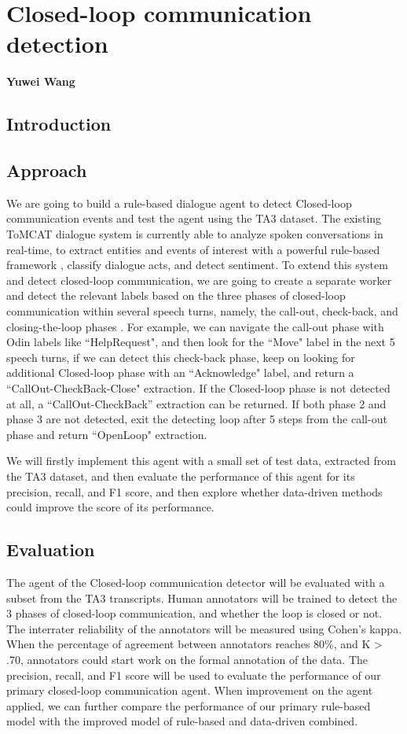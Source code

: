 \chapter{Closed-loop communication detection}
\label{ch:clc}
\textbf{Yuwei Wang}

\section{Introduction}

\section{Approach}

We are going to build a rule-based dialogue agent to detect Closed-loop communication events and test the agent using the TA3 dataset.
The existing ToMCAT dialogue system is currently able to analyze spoken
conversations in real-time, to extract entities and events of interest with a
powerful rule-based framework \citep{valenzuela-escarcega-etal-2016-odins}, classify
dialogue acts, and detect sentiment. To extend this system and detect
closed-loop communication, we are going to create a separate worker and detect
the relevant labels based on the three phases of closed-loop communication
within several speech turns, namely, the call-out, check-back, and
closing-the-loop phases \citep{Hargestam.ea:2013}. For example, we can
navigate the call-out phase with Odin labels like ``HelpRequest", and then look
for the ``Move" label in the next 5 speech turns, if we can detect this
check-back phase, keep on looking for additional Closed-loop phase with an
``Acknowledge" label, and return a ``CallOut-CheckBack-Close" extraction. If the
Closed-loop phase is not detected at all, a “CallOut-CheckBack” extraction can
be returned. If both phase 2 and phase 3 are not detected, exit the detecting
loop after 5 steps from the call-out phase and return ``OpenLoop" extraction.

We will firstly implement this agent with a small set of test data, extracted
from the TA3 dataset, and then evaluate the performance of this agent for its
precision, recall, and F1 score, and then explore whether data-driven methods
could improve the score of its performance.

\section{Evaluation}

The agent of the Closed-loop communication detector will be evaluated with a
subset from the TA3 transcripts. Human annotators will be trained to detect the
3 phases of closed-loop communication, and whether the loop is closed or not.
The interrater reliability of the annotators will be measured using Cohen’s
kappa. When the percentage of agreement between annotators reaches 80\%, and K
> .70, annotators could start work on the formal annotation of the data. The
precision, recall, and F1 score will be used to evaluate the performance of our
primary closed-loop communication agent. When improvement on the agent applied,
we can further compare the performance of our primary rule-based model with the
improved model of rule-based and data-driven combined.
